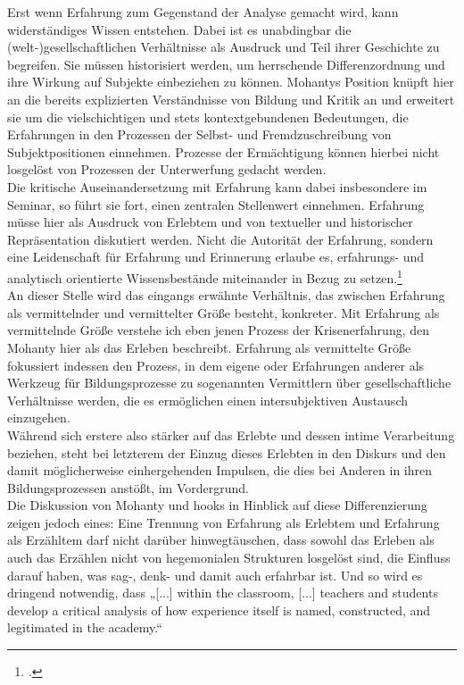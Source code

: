 \noindent Erst wenn Erfahrung zum Gegenstand der Analyse gemacht wird, kann
widerständiges Wissen entstehen. Dabei ist es unabdingbar die
(welt-)gesellschaftlichen Verhältnisse als Ausdruck und Teil ihrer Geschichte
zu begreifen. Sie müssen historisiert werden, um herrschende Differenzordnung
und ihre Wirkung auf Subjekte einbeziehen zu können. Mohantys Position knüpft
hier an die bereits explizierten Verständnisse von Bildung und Kritik an und
erweitert sie um die vielschichtigen und stets kontextgebundenen Bedeutungen,
die Erfahrungen in den Prozessen der Selbst- und Fremdzuschreibung von
Subjektpositionen einnehmen. Prozesse der Ermächtigung können hierbei nicht
losgelöst von Prozessen der Unterwerfung gedacht werden.\\
Die kritische Auseinandersetzung mit Erfahrung kann dabei insbesondere im
Seminar, so führt sie fort, einen zentralen Stellenwert einnehmen. Erfahrung
müsse hier als Ausdruck von Erlebtem und von textueller und historischer
Repräsentation diskutiert werden. Nicht die Autorität der Erfahrung, sondern
eine Leidenschaft für Erfahrung und Erinnerung erlaube es, erfahrungs- und
analytisch orientierte Wissensbestände miteinander in Bezug zu
setzen.\footnotemark\footcitetext{bellhooks}\\

\noindent An dieser Stelle wird das eingangs erwähnte Verhältnis, das zwischen Erfahrung
als vermittelnder und vermittelter Größe besteht, konkreter. Mit Erfahrung als
vermittelnde Größe verstehe ich eben jenen Prozess der Krisenerfahrung, den
Mohanty hier als das Erleben beschreibt. Erfahrung als vermittelte Größe
fokussiert indessen den Prozess, in dem eigene oder Erfahrungen anderer als
Werkzeug für Bildungsprozesse zu sogenannten Vermittlern über gesellschaftliche
Verhältnisse werden, die es ermöglichen einen intersubjektiven Austausch
einzugehen.\\
Während sich erstere also stärker auf das Erlebte und dessen intime
Verarbeitung beziehen, steht bei letzterem der Einzug dieses Erlebten in den
Diskurs und den damit möglicherweise einhergehenden Impulsen, die dies bei
Anderen in ihren Bildungsprozessen anstößt, im Vordergrund.\\

\noindent Die Diskussion von Mohanty und hooks in Hinblick auf diese Differenzierung
zeigen jedoch eines: Eine Trennung von Erfahrung als Erlebtem und Erfahrung als
Erzähltem darf nicht darüber hinwegtäuschen, dass sowohl das Erleben als auch
das Erzählen nicht von hegemonialen Strukturen losgelöst sind, die Einfluss
darauf haben, was sag-,  denk- und damit auch erfahrbar ist. Und so wird es
dringend notwendig, dass „[...] within the classroom, [...] teachers and
students develop a critical analysis of how experience itself is named,
constructed, and legitimated in the academy.“\footnotemark{}\\

